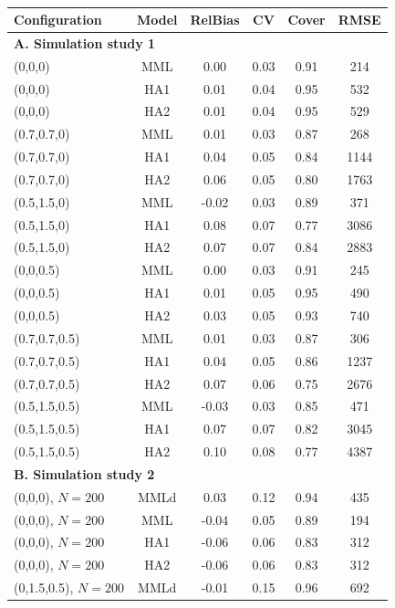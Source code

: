 \documentclass[12pt,fleqn]{article}
\begin{document}
\begin{table}[ht]
\caption{
}
\label{tab:sims}
\raggedright
\begin{tabular}{lccccc}
  \hline
   Configuration & Model & RelBias & CV & Cover & RMSE \\
  \hline
   \multicolumn{6}{l}{\textbf{A. Simulation study 1}}   \\
  \hline
  (0,0,0) & MML & 0.00 & 0.03 & 0.91 & 214 \\
  (0,0,0) & HA1 & 0.01 & 0.04 & 0.95 & 532 \\
  (0,0,0) & HA2 & 0.01 & 0.04 & 0.95 & 529 \\
  (0.7,0.7,0) & MML & 0.01 & 0.03 & 0.87 & 268 \\
  (0.7,0.7,0) & HA1 & 0.04 & 0.05 & 0.84 & 1144 \\
  (0.7,0.7,0) & HA2 & 0.06 & 0.05 & 0.80 & 1763 \\
  (0.5,1.5,0) & MML & -0.02 & 0.03 & 0.89 & 371 \\
  (0.5,1.5,0) & HA1 & 0.08 & 0.07 & 0.77 & 3086\\
  (0.5,1.5,0) & HA2 & 0.07 & 0.07 & 0.84 & 2883 \\
  (0,0,0.5) & MML & 0.00 & 0.03 & 0.91 & 245 \\
  (0,0,0.5) & HA1 & 0.01 & 0.05 & 0.95 & 490 \\
  (0,0,0.5) & HA2 & 0.03 & 0.05 & 0.93 & 740 \\
  (0.7,0.7,0.5) & MML & 0.01 & 0.03 & 0.87 & 306 \\
  (0.7,0.7,0.5) & HA1 & 0.04 & 0.05 & 0.86 & 1237 \\
  (0.7,0.7,0.5) & HA2 & 0.07 & 0.06 & 0.75 & 2676 \\
  (0.5,1.5,0.5) & MML & -0.03 & 0.03 & 0.85 & 471  \\
  (0.5,1.5,0.5) & HA1 & 0.07 & 0.07 & 0.82 & 3045 \\
  (0.5,1.5,0.5) & HA2 & 0.10 & 0.08 & 0.77 & 4387 \\
  \hline
    \multicolumn{6}{l}{\textbf{B. Simulation study 2}}   \\
  \hline
  (0,0,0), $N=200$ & MMLd & 0.03 & 0.12 & 0.94 & 435 \\
  (0,0,0), $N=200$ & MML & -0.04 & 0.05 & 0.89 & 194 \\
  (0,0,0), $N=200$ & HA1 & -0.06 & 0.06 & 0.83 & 312 \\
  (0,0,0), $N=200$ & HA2 & -0.06 & 0.06 & 0.83 & 312 \\
  (0,1.5,0.5), $N=200$ & MMLd & -0.01 & 0.15 & 0.96 & 692  \\

\end{tabular}
\end{table}
\end{document}
